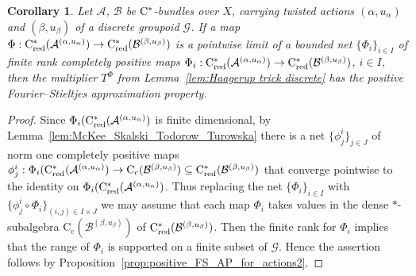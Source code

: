 \documentclass[11 pt, leqno]{amsart}
\numberwithin{equation}{section}
\theoremstyle{plain}
\newtheorem{cor}[thm]{Corollary}
\theoremstyle{definition}
\newtheorem {defn}[thm] {Definition}
\newtheorem {rem} [thm]{Remark}
\newcommand*{\contc}{\mathrm{C_c}}%
\DeclareMathOperator{\red}{red}%
\DeclareMathOperator{\supp}{supp}
\newcommand{\B}{\mathcal B}
\newcommand{\G}{\mathcal G} %
\newcommand{\A}{\mathcal A}
\newcommand{\cst}{\ifmmode\mathrm{C}^*\else{$\mathrm{C}^*$}\fi}
\begin{document}



\begin{cor}\label{cor:discrete_Haagerup_approximation} 
Let $\A$, $\B$ be $\cst$-bundles over $X$, carrying twisted actions $(\alpha,u_\alpha)$ and $(\beta,u_\beta)$ of a discrete groupoid $\G$. 
If a map $\Phi : \cst_{\red}(\A^{(\alpha,u_\alpha)}) \to \cst_{\red}(\B^{(\beta,u_\beta)})$ is a pointwise limit of a bounded net $\{\Phi_{i}\}_{i\in I}$ of finite rank completely positive maps $\Phi_i : \cst_{\red}(\A^{(\alpha,u_\alpha)})\to \cst_{\red}(\B^{(\beta,u_\beta)})$, $i\in I$, then the multiplier $T^{\Phi}$ from Lemma~\ref{lem:Haagerup trick discrete} has the positive Fourier--Stieltjes approximation property. %
\end{cor}
\begin{proof}  
Since $\Phi_{i}(\cst_{\red}(\A^{(\alpha,u_\alpha)})$ is finite dimensional, by Lemma~\ref{lem:McKee_Skalski_Todorow_Turowska} there is a net $\{\phi^i_j\}_{j\in J}$ of norm one completely positive maps $\phi_{j}^i:\Phi_{i}(\cst_{\red}(\A^{(\alpha,u_\alpha)}) \to \contc(\B^{(\beta,u_\beta)})\subseteq \cst_{\red}(\B^{(\beta,u_\beta)})$ that converge pointwise to the identity on $\Phi_{i}(\cst_{\red}(\A^{(\alpha,u_\alpha)})$. 
Thus replacing the net $\{\Phi_{i}\}_{i\in I}$ with $\{\phi_{j}^i\circ \Phi_{i}\}_{(i,j)\in I\times J}$ we may assume that each map $\Phi_{i}$ takes values in the dense $*$-subalgebra $\contc(\B^{(\beta,u_\beta)})$ of $\cst_{\red}(\B^{(\beta,u_\beta)})$. 
Then the finite rank for $\Phi_{i}$ implies that the range of $\Phi_{i}$ is supported on a finite subset of $\G$. 
Hence the assertion follows by Proposition~\ref{prop:positive_FS_AP_for_actions2}.
\end{proof}
\end{document}
